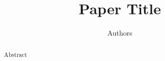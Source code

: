 \documentclass{article}
\theoremstyle{definition}
\begin{document}
\title{Paper Title}
\author{Authors}
\maketitle


\begin{abstract}
Abstract
\end{abstract}






\end{document}
